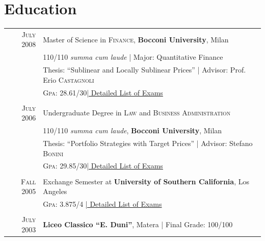 \documentclass[a4paper,10pt]{article}
\begin{document}
\section{Education}
\begin{tabular}{rl}	
 \textsc{July} 2008 & Master of Science in \textsc{Finance}, \textbf{Bocconi University}, Milan\\
& 110/110 \small\emph{summa cum laude} | Major: Quantitative Finance\\
& Thesis: ``Sublinear and Locally Sublinear Prices'' | \small Advisor: Prof. Erio \textsc{Castagnoli}\\
&\normalsize \textsc{Gpa}: 28.61/30\hyperlink{grds}{\hfill | \footnotesize Detailed List of Exams}\\&\\
\textsc{July} 2006& Undergraduate Degree in \textsc{Law} and \textsc{Business Administration} \\&110/110 \small\emph{summa cum laude}, \normalsize\textbf{Bocconi University}, Milan\\
& Thesis: ``Portfolio Strategies with Target Prices'' | \small Advisor: Stefano \textsc{Bonini}\\
&\normalsize \textsc{Gpa}: 29.85/30\hyperlink{grds_cleli}{\hfill| \footnotesize Detailed List of Exams}\\&\\
\textsc{Fall} 2005& Exchange Semester at \textbf{University of Southern California}, Los Angeles\\
&\textsc{Gpa}: 3.875/4 \hyperlink{grds_usc}{\hfill| \footnotesize Detailed List of Exams}\\&\\
\textsc{July} 2003& \textbf{Liceo Classico ``E. Duni''}, Matera | Final Grade: 100/100
\end{tabular}

\end{document}
